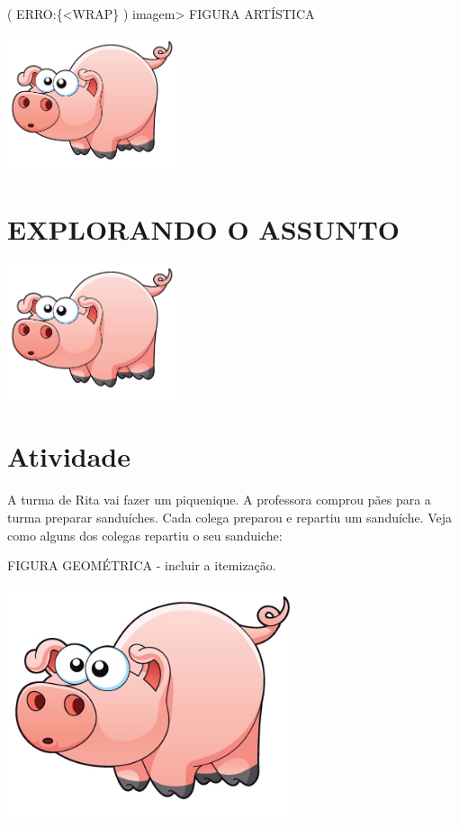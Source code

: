\documentclass[a4,12pt]{book}
\begin{document}
( ERRO:\{<WRAP\} ) imagem> FIGURA ARTÍSTICA 

\includegraphics[width=\textwidth,height=4cm, keepaspectratio]{pig}
\section*{ EXPLORANDO O ASSUNTO }








\includegraphics[width=\textwidth,height=4cm, keepaspectratio]{pig}
\section{Atividade}







A turma de Rita vai fazer um piquenique. A professora comprou pães para a turma preparar sanduíches. Cada colega preparou e repartiu um sanduíche. Veja como alguns dos colegas repartiu o seu sanduiche:

\begin{imagem*}[breakable]{}{}   FIGURA GEOMÉTRICA - incluir a itemização.  
  
    \includegraphics[width=240pt, keepaspectratio]{pig}  
  
\end{imagem*}
\end{document}
